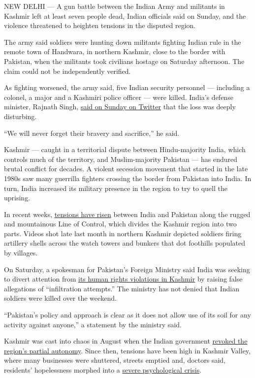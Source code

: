 NEW DELHI --- A gun battle between the Indian Army and militants in
Kashmir left at least seven people dead, Indian officials said on
Sunday, and the violence threatened to heighten tensions in the disputed
region.

The army said soldiers were hunting down militants fighting Indian rule
in the remote town of Handwara, in northern Kashmir, close to the border
with Pakistan, when the militants took civilians hostage on Saturday
afternoon. The claim could not be independently verified.

As fighting worsened, the army said, five Indian security personnel ---
including a colonel, a major and a Kashmiri police officer --- were
killed. India's defense minister, Rajnath Singh,
\href{https://twitter.com/rajnathsingh/status/1256809990062436352}{said
on Sunday on Twitter} that the loss was deeply disturbing.

``We will never forget their bravery and sacrifice,'' he said.

Kashmir --- caught in a territorial dispute between Hindu-majority
India, which controls much of the territory, and Muslim-majority
Pakistan --- has endured brutal conflict for decades. A violent
secession movement that started in the late 1980s saw many guerrilla
fighters crossing the border from Pakistan into India. In turn, India
increased its military presence in the region to try to quell the
uprising.

In recent weeks,
\href{https://www.nytimes.com/aponline/2020/05/02/world/asia/ap-as-kashmir-india-pakistan.html}{tensions
have risen} between India and Pakistan along the rugged and mountainous
Line of Control, which divides the Kashmir region into two parts. Videos
shot late last month in northern Kashmir depicted soldiers firing
artillery shells across the watch towers and bunkers that dot foothills
populated by villages.

On Saturday, a spokesman for Pakistan's Foreign Ministry said India was
seeking to divert attention from
\href{https://www.nytimes.com/2019/07/06/world/asia/kashmir-india-torture.html}{its
human rights violations in Kashmir} by raising false allegations of
``infiltration attempts.'' The ministry has not denied that Indian
soldiers were killed over the weekend.

``Pakistan's policy and approach is clear as it does not allow use of
its soil for any activity against anyone,'' a statement by the ministry
said.

Kashmir was cast into chaos in August when the Indian government
\href{https://www.nytimes.com/2019/08/05/world/asia/india-pakistan-kashmir-jammu.html}{revoked
the region's partial autonomy}. Since then, tensions have been high in
Kashmir Valley, where many businesses were shuttered, streets emptied
and, doctors said, residents' hopelessness morphed into a
\href{https://www.nytimes.com/2020/04/26/world/asia/kasmir-india-mental-health-coronavirus.html}{severe
psychological crisis}.

